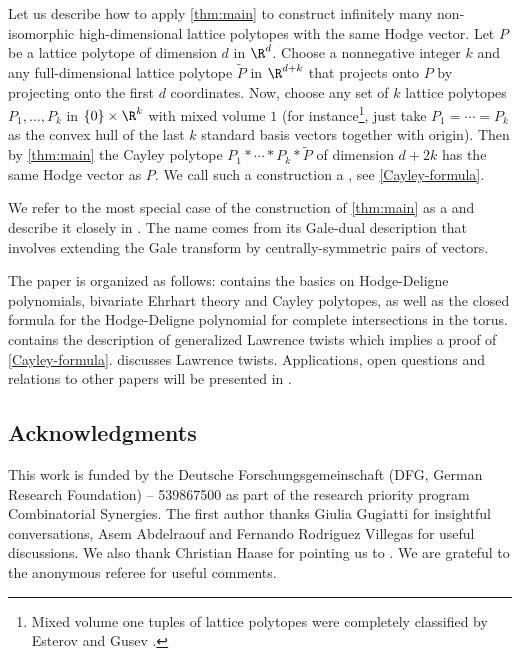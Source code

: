 \documentclass[reqno, 11pt, a4paper, oneside]{amsart}
\begin{document}
\smallskip

Let us describe how to apply \cref{thm:main} to construct infinitely many non-isomorphic high-dimensional lattice polytopes with the same Hodge vector. Let $P$ be a lattice polytope of dimension $d$ in $\R^d$. Choose a nonnegative integer $k$ and any full-dimensional lattice polytope $\tilde{P}$ in $\R^{d+k}$ that projects onto $P$ by projecting onto the first $d$ coordinates. Now, choose any set of $k$ lattice polytopes $P_1, \ldots, P_k$ in $\{0\} \times \R^k$ with mixed volume $1$ (for instance\footnote{Mixed volume one tuples of lattice polytopes were completely classified by Esterov and Gusev \cite{mvone}.}, just take $P_1=\cdots=P_k$ as the convex hull of the last $k$ standard basis vectors together with origin). Then by \cref{thm:main} the Cayley polytope $P_1 * \cdots * P_k * \tilde{P}$ of dimension $d+2k$ has the same Hodge vector as $P$. We call such a  construction a , see \cref{Cayley-formula}. 

 We refer to the most special case of the construction of \cref{thm:main} as a  and describe it closely in . The name comes from its Gale-dual description that involves extending the Gale transform by centrally-symmetric pairs of vectors. 

\medskip

The paper is organized as follows:  contains the basics on Hodge-Deligne polynomials, bivariate Ehrhart theory and Cayley polytopes, as well as the closed formula for the Hodge-Deligne polynomial for complete intersections in the torus.  contains the description of generalized Lawrence twists which implies a proof of \cref{Cayley-formula}.  discusses Lawrence twists. Applications, open questions and relations to other papers will be presented in . 

\subsection*{Acknowledgments}
This work is funded by the Deutsche Forschungsgemeinschaft (DFG, German Research Foundation) – 539867500 as part of the research priority program Combinatorial Synergies.  The first author thanks Giulia Gugiatti for insightful conversations, Asem Abdelraouf and Fernando Rodriguez Villegas for useful discussions. We also thank Christian Haase for pointing us to \cite{Halit_Dur}. We are grateful to the anonymous referee for useful comments.
\end{document}
